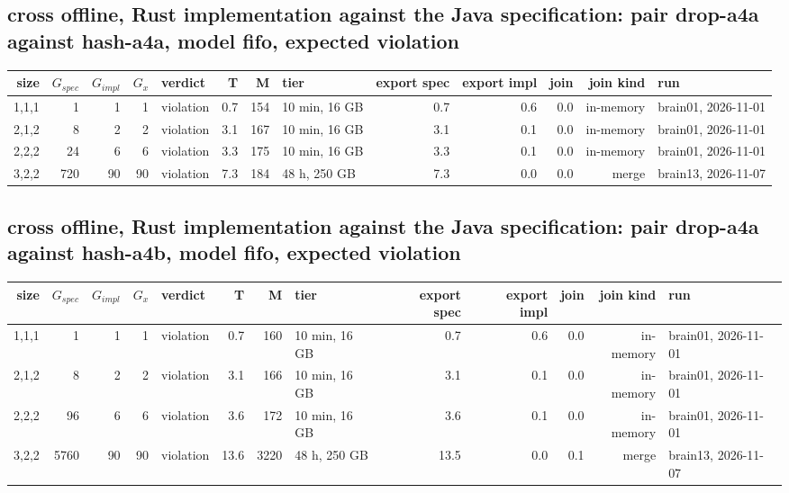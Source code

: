 \documentclass[10pt]{article}
\begin{document}
\subsection*{cross offline, Rust implementation against the Java specification: pair \textsf{drop-a4a} against \textsf{hash-a4a}, model fifo, expected violation}
\begin{longtable}{@{}rrrrlrrlrrrrl@{}}
\toprule
size & $G_{\mathit{spec}}$ & $G_{\mathit{impl}}$ & $G_x$ & verdict & T & M & tier & export spec & export impl & join & join kind & run \\
\midrule
\endhead
\color{red} 1,1,1 & 1 & 1 & 1 & violation & 0.7 & 154 & 10 min, 16 GB & 0.7 & 0.6 & 0.0 & in-memory & brain01, 2026-11-01 \\
\color{red} 2,1,2 & 8 & 2 & 2 & violation & 3.1 & 167 & 10 min, 16 GB & 3.1 & 0.1 & 0.0 & in-memory & brain01, 2026-11-01 \\
\color{red} 2,2,2 & 24 & 6 & 6 & violation & 3.3 & 175 & 10 min, 16 GB & 3.3 & 0.1 & 0.0 & in-memory & brain01, 2026-11-01 \\
\color{red} 3,2,2 & 720 & 90 & 90 & violation & 7.3 & 184 & 48 h, 250 GB & 7.3 & 0.0 & 0.0 & merge & brain13, 2026-11-07 \\
\bottomrule
\end{longtable}
\subsection*{cross offline, Rust implementation against the Java specification: pair \textsf{drop-a4a} against \textsf{hash-a4b}, model fifo, expected violation}
\begin{longtable}{@{}rrrrlrrlrrrrl@{}}
\toprule
size & $G_{\mathit{spec}}$ & $G_{\mathit{impl}}$ & $G_x$ & verdict & T & M & tier & export spec & export impl & join & join kind & run \\
\midrule
\endhead
\color{red} 1,1,1 & 1 & 1 & 1 & violation & 0.7 & 160 & 10 min, 16 GB & 0.7 & 0.6 & 0.0 & in-memory & brain01, 2026-11-01 \\
\color{red} 2,1,2 & 8 & 2 & 2 & violation & 3.1 & 166 & 10 min, 16 GB & 3.1 & 0.1 & 0.0 & in-memory & brain01, 2026-11-01 \\
\color{red} 2,2,2 & 96 & 6 & 6 & violation & 3.6 & 172 & 10 min, 16 GB & 3.6 & 0.1 & 0.0 & in-memory & brain01, 2026-11-01 \\
\color{red} 3,2,2 & 5760 & 90 & 90 & violation & 13.6 & 3220 & 48 h, 250 GB & 13.5 & 0.0 & 0.1 & merge & brain13, 2026-11-07 \\
\bottomrule
\end{longtable}
\end{document}
